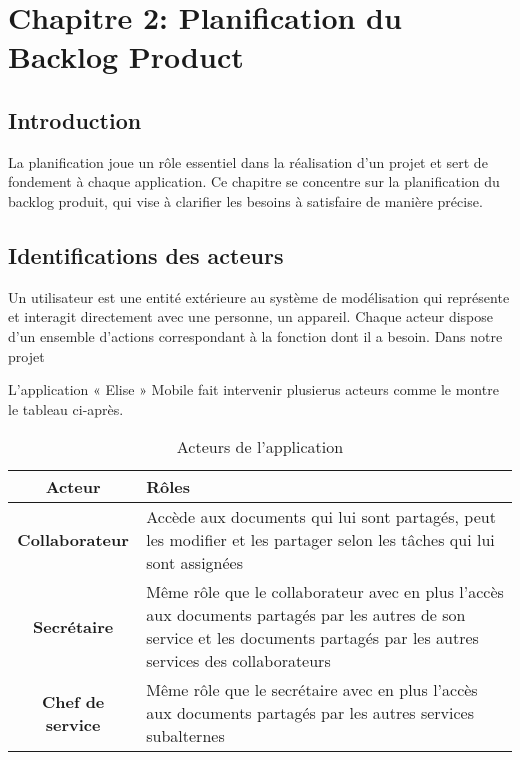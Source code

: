 \chapter*{Chapitre 2: Planification du Backlog Product}
\label{chap:analyseEtConception}
\setcounter{part}{0}
\setcounter{chapter}{0}
\setcounter{section}{0}
\renewcommand{\thechapter}{\arabic{chapter}}
\renewcommand{\thepart}{\arabic{part}}
\renewcommand{\thesection}{\arabic{section}}
\section*{Introduction}
La planification joue un rôle essentiel dans la réalisation d'un projet et sert de fondement à chaque application. Ce chapitre se concentre sur la planification du backlog produit, qui vise à clarifier les besoins à satisfaire de manière précise.

\section{Identifications des acteurs}
Un utilisateur est une entité extérieure au système de modélisation qui représente et interagit directement avec une personne, un appareil. \cite{acteurUml}
Chaque acteur dispose d'un ensemble
d'actions correspondant à la fonction dont il a besoin. Dans notre projet

L'application « Elise » Mobile fait intervenir plusierus acteurs comme le montre le tableau ci-après.

\begin{table}[h]
  \caption{Acteurs de l'application}
\label{tab:acteurs}
\setlength\tabcolsep{3pt}
\centering
\begin{tabularx}{\textwidth}{|c|L|}
\hline
Acteur  &  Rôles \\ 
\hline
\textbf{Collaborateur}  &  Accède aux documents qui lui sont partagés, peut les modifier et les partager selon les tâches qui lui sont assignées \\ \hline
\textbf{Secrétaire}  &  Même rôle que le collaborateur avec en plus l'accès aux documents partagés par les autres de son service et les documents partagés par les autres services des collaborateurs \\ \hline
\textbf{Chef de service}  &  Même rôle que le secrétaire avec en plus l'accès aux documents partagés par les autres services subalternes \\ \hline
\end{tabularx}
\end{table}



